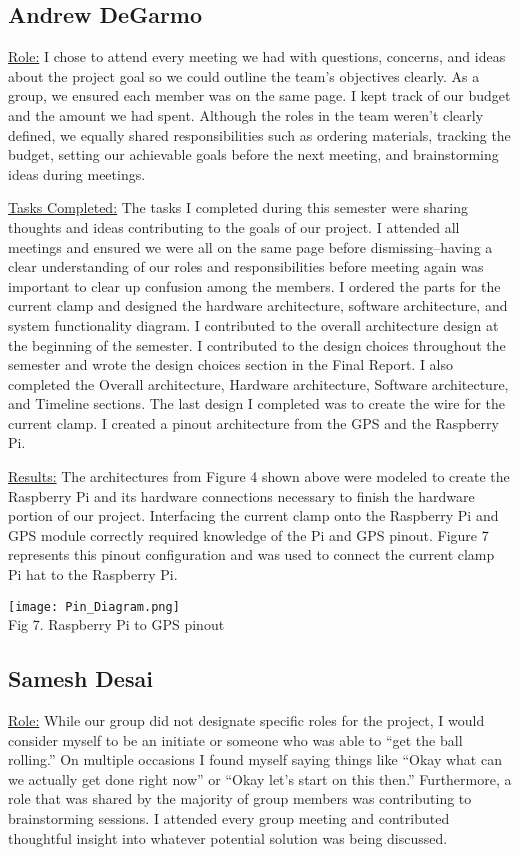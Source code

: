 \subsection{Andrew DeGarmo}
\underline{Role:} I chose to attend every meeting we had with questions, concerns, and ideas about the project goal so we could outline the team’s objectives clearly. 
As a group, we ensured each member was on the same page. 
I kept track of our budget and the amount we had spent. 
Although the roles in the team weren’t clearly defined, we equally shared responsibilities such as ordering materials, tracking the budget, setting our achievable goals before the next meeting, and brainstorming ideas during meetings.

\underline{Tasks Completed:} The tasks I completed during this semester were sharing thoughts and ideas contributing to the goals of our project. 
I attended all meetings and ensured we were all on the same page before dismissing–having a clear understanding of our roles and responsibilities before meeting again was important to clear up confusion among the members. 
I ordered the parts for the current clamp and designed the hardware architecture, software architecture, and system functionality diagram. 
I contributed to the overall architecture design at the beginning of the semester. 
I contributed to the design choices throughout the semester and wrote the design choices section in the Final Report. 
I also completed the Overall architecture, Hardware architecture, Software architecture, and Timeline sections. 
The last design I completed was to create the wire for the current clamp. 
I created a pinout architecture from the GPS and the Raspberry Pi.

\underline{Results:} The architectures from Figure 4 shown above were modeled to create the Raspberry Pi and its hardware connections necessary to finish the hardware portion of our project. 
Interfacing the current clamp onto the Raspberry Pi and GPS module correctly required knowledge of the Pi and GPS pinout. 
Figure 7 represents this pinout configuration and was used to connect the current clamp Pi hat to the Raspberry Pi.

\begin{center}
    \texttt{[image: Pin\_Diagram.png]}\\
    Fig 7. Raspberry Pi to GPS pinout
\end{center}

\subsection{Samesh Desai}
\underline{Role:} While our group did not designate specific roles for the project, I would consider myself to be an initiate or someone who was able to “get the ball rolling.” 
On multiple occasions I found myself saying things like “Okay what can we actually get done right now” or “Okay let's start on this then.”  
Furthermore, a role that was shared by the majority of group members was contributing to brainstorming sessions. 
I attended every group meeting and contributed thoughtful insight into whatever potential solution was being discussed.

